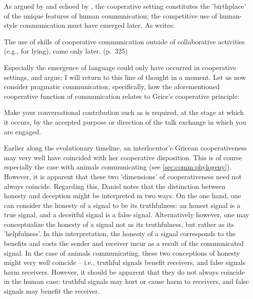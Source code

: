As argued by \citet{Tomasello08, Tomasello09} and echoed by \citet{Dor17}, the cooperative setting constitutes the 'birthplace' of the unique features of human communication; the competitive use of human-style communication must have emerged later. As \citet{Tomasello08} writes:
\begin{quoting}
    The use of skills of cooperative communication outside of collaborative activities (e.g., for lying), came only later.
    \hfill (p.~325)
\end{quoting}
Especially the emergence of language could only have occurred in cooperative settings, \citet{Tomasello08} and \citet{Dor17} argue; I will return to this line of thought in a moment.
Let us now consider pragmatic communication; specifically, how the aforementioned cooperative function of communication relates to Grice's cooperative principle:
\begin{quoting}
    Make your conversational contribution such as is required, at the stage at which it occurs, by the accepted purpose or direction of the talk exchange in which you are engaged.
    \hfill \citep[p.~45]{Grice75}
\end{quoting}
Earlier along the evolutionary timeline, an interlocutor's Gricean cooperativeness may very well have coincided with her cooperative disposition. This is of course especially the case with animals communicating (see \cref{sec:comm:phylogeny}).
However, it is apparent that these two 'dimensions' of cooperativeness need not always coincide.
Regarding this, Daniel \citet{Dor17} notes that the distinction between honesty and deception might be interpreted in two ways. On the one hand, one can consider the honesty of a signal to be its truthfulness: an honest signal is a true signal, and a deceitful signal is a false signal. Alternatively however, one may conceptualize the honesty of a signal not as its truthfulness, but rather as its 'helpfulness'. In this interpretation, the honesty of a signal corresponds to the benefits and costs the sender and receiver incur as a result of the communicated signal. In the case of animals communicating, these two conceptions of honesty might very well coincide -- i.e., truthful signals benefit receivers, and false signals harm receivers. However, it should be apparent that they do not always coincide in the human case: truthful signals may hurt or cause harm to receivers, and false signals may benefit the receiver.

